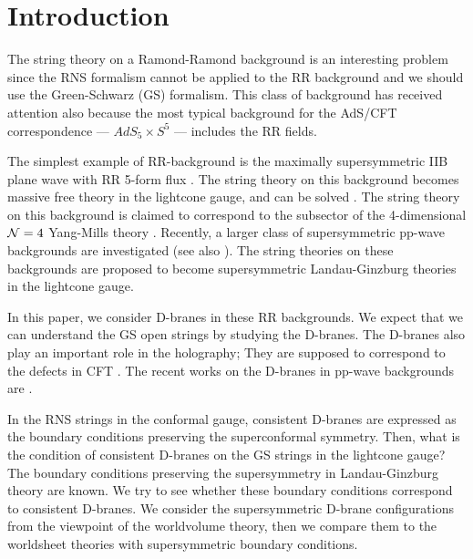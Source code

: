 \documentclass[a4paper,12pt]{article}
\numberwithin{equation}{section}
\newcommand{\Ncal}{{\cal N}}
\begin{document}
\newpage
\setcounter{page}{1}


\section{Introduction}

The string theory on a Ramond-Ramond background is an interesting problem
since the RNS formalism cannot be applied to the RR background and
we should use the Green-Schwarz (GS) formalism. 
This class of background has received attention
also because the most typical background for the AdS/CFT 
correspondence --- $AdS_5 \times S^5$ --- includes the RR fields.

The simplest example of RR-background is the maximally supersymmetric
IIB plane wave with RR 5-form flux \cite{Blau:2001ne,Blau:2002dy,Blau:2002mw}. 
The string theory on this background becomes massive free theory
in the lightcone gauge, and can be solved \cite{Metsaev:2001bj,Metsaev:2002re}.
The string theory on this background is claimed to correspond to the
subsector of
the 4-dimensional $\Ncal=4$
Yang-Mills theory \cite{Berenstein:2002jq}.
Recently, a larger class of supersymmetric pp-wave backgrounds are
investigated \cite{Maldacena:2002fy} (see also
 \cite{Berkovits:2002vn,Russo:2002qj,Bonelli:2002fs,Berkovits:2002rd}).
The string theories
on these backgrounds are proposed to become supersymmetric Landau-Ginzburg
theories in the lightcone gauge.

In this paper, we consider D-branes in these RR backgrounds. 
We expect that we can understand the GS open strings by studying the
D-branes. The D-branes also play an important role in the holography; 
They are supposed to correspond to the defects in CFT
\cite{Karch:2000gx,DeWolfe:2001pq,Bachas:2001vj,Erdmenger:2002ex,Mateos:2002bu,Yamaguchi:2002pa}. 
The recent works on the D-branes in pp-wave backgrounds are
\cite{Billo:2002ff,Dabholkar:2002zc,Berenstein:2002zw,%
   Chu:2002in,Lee:2002cu,Kumar:2002ps,%
   Skenderis:2002vf,Balasubramanian:2002sa,Takayanagi:2002je,%
   Bain:2002nq,Alishahiha:2002rw,Bergman:2002hv,Seki:2002wz,Mateos:2002an,%
   Pal:2002vx,Naculich:2002fh,Michishita:2002jp,Bain:2002tq,Alishahiha:2002nf,%
   Biswas:2002yz,Takayanagi:2002nv,Nayak:2002ty}.

In the RNS strings in the conformal gauge, consistent D-branes
are expressed as the boundary conditions
preserving the superconformal symmetry. 
Then, what is the condition of consistent D-branes 
on the GS strings in the lightcone gauge?
The boundary conditions preserving the supersymmetry in Landau-Ginzburg theory
are known\cite{Hori:2000ck}. We try to see whether these boundary
conditions correspond to consistent D-branes.
We consider the supersymmetric D-brane configurations from the viewpoint
of the worldvolume theory, 
then we compare them to the worldsheet theories with supersymmetric
boundary conditions.
\end{document}
